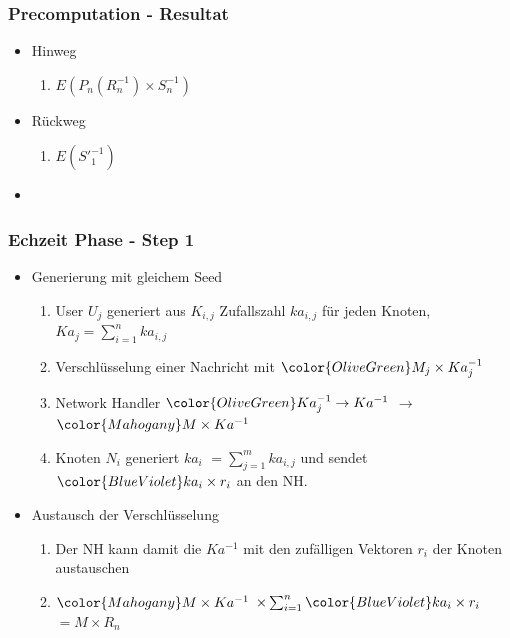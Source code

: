 \documentclass[t, xcolor=dvipsnames]{beamer}
\begin{document}
\begin{frame}
	\frametitle{Precomputation - Resultat}
	\begin{itemize}
		
		\item Hinweg
		\begin{enumerate}
			\item $E(P_n(R_n^{-1}) \times S_n^{-1})$
		\end{enumerate}
		\item Rückweg
		\begin{enumerate}
			\item $E({S'}_1^{-1})$
		\end{enumerate}
		\item 
		
		 
	\end{itemize}
	\vspace{\fill}
\end{frame}


\begin{frame}
	\frametitle{Echzeit Phase - Step 1}
	\begin{itemize}
		\item Generierung mit gleichem Seed
		\begin{enumerate}
		\item User $U_j$ generiert aus $K_{i,j}$ Zufallszahl $ka_{i,j}$ für jeden Knoten, $Ka_j = \sum_{i=1}^n ka_{i,j}$
		\item Verschlüsselung einer Nachricht mit $\color{OliveGreen} M_j \times Ka_j ^{-1}$
		\item Network Handler $\color{OliveGreen}Ka_j ^{-1} \rightarrow Ka^{-1}$ $\rightarrow$ $\color{Mahogany} M \times Ka^{-1}$
		\item Knoten $N_i$ generiert $ka_i$ $= \sum_{j=1}^m ka_{i,j}$ und sendet $\color{BlueViolet}ka_i \times r_i$ an den NH.
		
		\end{enumerate}
		\item Austausch der Verschlüsselung
		\begin{enumerate}
		
		\item Der NH kann damit die $Ka^{-1}$ mit den zufälligen Vektoren $r_i$ der Knoten austauschen
		\item $ \color{Mahogany} M \times Ka^{-1}$ $\times \sum_{i=1}^n \color{BlueViolet}ka_i \times r_i$ $= M \times R_n$

		\end{enumerate}

		
	\end{itemize}
	\vspace{\fill}
\end{frame}
\end{document}
